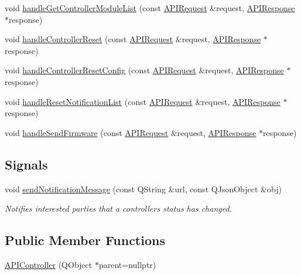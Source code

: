 \begin{DoxyCompactItemize}
void \hyperlink{class_a_p_i_controller_a20ce823aeb786d2af26fde41c2dc74a1}{handle\+Get\+Controller\+Module\+List} (const \hyperlink{class_a_p_i_request}{A\+P\+I\+Request} \&request, \hyperlink{class_a_p_i_response}{A\+P\+I\+Response} $\ast$response)
\item 
void \hyperlink{class_a_p_i_controller_a0e01eab749423dcfff0b595abf4175ad}{handle\+Controller\+Reset} (const \hyperlink{class_a_p_i_request}{A\+P\+I\+Request} \&request, \hyperlink{class_a_p_i_response}{A\+P\+I\+Response} $\ast$response)
\item 
void \hyperlink{class_a_p_i_controller_a0d4deeaff703bb7d60eb344e6ee9f8cb}{handle\+Controller\+Reset\+Config} (const \hyperlink{class_a_p_i_request}{A\+P\+I\+Request} \&request, \hyperlink{class_a_p_i_response}{A\+P\+I\+Response} $\ast$response)
\item 
void \hyperlink{class_a_p_i_controller_a9b2f08f4b0a67c0a4f6891a9d8601b93}{handle\+Reset\+Notification\+List} (const \hyperlink{class_a_p_i_request}{A\+P\+I\+Request} \&request, \hyperlink{class_a_p_i_response}{A\+P\+I\+Response} $\ast$response)
\item 
void \hyperlink{class_a_p_i_controller_a2e140228ff2335d0d1a92d2353702c22}{handle\+Send\+Firmware} (const \hyperlink{class_a_p_i_request}{A\+P\+I\+Request} \&request, \hyperlink{class_a_p_i_response}{A\+P\+I\+Response} $\ast$response)
\end{DoxyCompactItemize}
\subsection*{Signals}
\begin{DoxyCompactItemize}
\item 
\mbox{\label{class_a_p_i_controller_aa31deccd23ec06a6dc92b449b0bc86f8}} 
void \hyperlink{class_a_p_i_controller_aa31deccd23ec06a6dc92b449b0bc86f8}{send\+Notification\+Message} (const Q\+String \&url, const Q\+Json\+Object \&obj)
\begin{DoxyCompactList}\small\item\em Notifies interested parties that a controller\textquotesingle{}s status has changed. \end{DoxyCompactList}\end{DoxyCompactItemize}
\subsection*{Public Member Functions}
\begin{DoxyCompactItemize}
\item 
\hyperlink{class_a_p_i_controller_a779b634bce4b7fcbec9fca8f5f8f63e6}{A\+P\+I\+Controller} (Q\+Object $\ast$parent=nullptr)
\end{DoxyCompactItemize}


